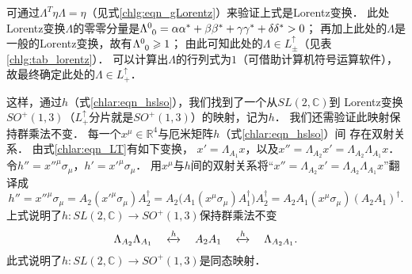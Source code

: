 可通过$\Lambda ^T \eta \Lambda = \eta$（见式\eqref{chlg:eqn_gLorentz}）来验证上式是Lorentz变换．
此处Lorentz变换$\Lambda$的零零分量是$\Lambda^{0}_{\hphantom{0} 0}=\alpha {\alpha ^*} + \beta {\beta ^*}
+ \gamma {\gamma ^*} + \delta {\delta ^*} > 0$；
再加上此处的$\Lambda$是一般的Lorentz变换，故有$\Lambda^{0}_{\hphantom{0} 0}\geqslant 1$；
由此可知此处的$\Lambda\in L^{\uparrow}_{\pm}$（见表\ref{chlg:tab_lorentz}）．
可以计算出$\Lambda$的行列式为$1$（可借助计算机符号运算软件），
故最终确定此处的$\Lambda\in L^{\uparrow}_{+}$．

这样，通过$h$（式\eqref{chlar:eqn_hslso}），我们找到了一个从$SL(2,\mathbb{C})$到
Lorentz变换$SO^{+}(1,3)$（$L^{\uparrow}_{+}$分片就是$SO^{+}(1,3)$）的映射，记为$h$．
我们还需验证此映射保持群乘法不变．
每一个$x^\mu \in \mathbb{R}^4$与厄米矩阵$h$（式\eqref{chlar:eqn_hslso}）间
存在双射关系．
由式\eqref{chlar:eqn_LT}有如下变换，
$x'=\Lambda_{A_1} x$，以及$x''=\Lambda_{A_2} x'=\Lambda_{A_2} \Lambda_{A_1}x$．
令$h''=x''^\mu \sigma_\mu$，$h'=x'^\mu \sigma_\mu$．
用$x^\mu $与$h$间的双射关系将“$x''=\Lambda_{A_2} x'=\Lambda_{A_2} \Lambda_{A_1}x$”翻译成
\begin{equation*}
    h''=x''^\mu \sigma_\mu=A_2 (x'^\mu \sigma_\mu) A_2^\dagger
    =A_2 \bigl( A_1(x^\mu \sigma_\mu)A_1^\dagger \bigr) A_2^\dagger
    = A_2 A_1 (x^\mu \sigma_\mu) (A_2A_1)^\dagger .
\end{equation*}
上式说明了$h:SL(2,\mathbb{C})\to SO^{+}(1,3)$保持群乘法不变
\begin{equation}
    \Lambda_{A_2}\Lambda_{A_1} \quad \xleftrightarrow{h} \quad  A_2 A_1
     \quad \xleftrightarrow{h}\quad \Lambda_{A_2 A_1}.
\end{equation}
此式说明了$h:SL(2,\mathbb{C})\to SO^{+}(1,3)$是同态映射．


